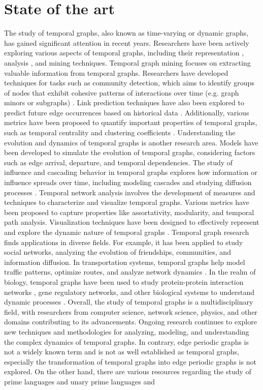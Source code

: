 \section{State of the art}
The study of temporal graphs, also known as time-varying or dynamic graphs, has gained significant attention in recent years. Researchers have been actively exploring various aspects of temporal graphs, including their representation \cite{Holme_2012}, analysis \cite{DBLP:journals/corr/Erlebach0K15}\cite{DBLP:journals/corr/Michail15}, and mining techniques. Temporal graph mining focuses on extracting valuable information from temporal graphs. Researchers have developed techniques for tasks such as community detection, which aims to identify groups of nodes that exhibit cohesive patterns of interactions over time (e.g. graph minors or subgraphs) \cite{arrighi2022multiparameter}. Link prediction techniques have also been explored to predict future edge occurrences based on historical data \cite{temporalLinkPrediction}. Additionally, various metrics have been proposed to quantify important properties of temporal graphs, such as temporal centrality and clustering coefficients \cite{temporalClusterCoefficient}. Understanding the evolution and dynamics of temporal graphs is another research area. Models have been developed to simulate the evolution of temporal graphs, considering factors such as edge arrival, departure, and temporal dependencies. The study of influence and cascading behavior in temporal graphs explores how information or influence spreads over time, including modeling cascades and studying diffusion processes \cite{temporalEvolution}. Temporal network analysis involves the development of measures and techniques to characterize and visualize temporal graphs. Various metrics have been proposed to capture properties like assortativity, modularity, and temporal path analysis. Visualization techniques have been designed to effectively represent and explore the dynamic nature of temporal graphs \cite{kerracher2014design}. Temporal graph research finds applications in diverse fields. For example, it has been applied to study social networks, analyzing the evolution of friendships, communities, and information diffusion. In transportation systems, temporal graphs help model traffic patterns, optimize routes, and analyze network dynamics \cite{tang2009temporal}. In the realm of biology, temporal graphs have been used to study protein-protein interaction networks \cite{fu2022dppin}, gene regulatory networks, and other biological systems to understand dynamic processes \cite{dibrita2022temporal}. Overall, the study of temporal graphs is a multidisciplinary field, with researchers from computer science, network science, physics, and other domains contributing to its advancements. Ongoing research continues to explore new techniques and methodologies for analyzing, modeling, and understanding the complex dynamics of temporal graphs. In contrary, edge periodic graphs is not a widely known term and is not as well established as temporal graphs, especially the transformation of temporal graphs into edge periodic graphs is not explored. On the other hand, there are various resources regarding the study of prime languages and unary prime languages and 
